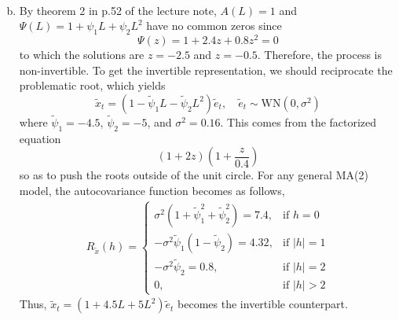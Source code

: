 \documentclass[answers]{exam}
\begin{document}
\begin{questions}
\begin{solution}
\begin{enumerate}[(a)]
\begin{align}
        \end{align}
        \item By theorem 2 in p.52 of the lecture note, $A(L)=1$ and $\Psi(L)=1+\psi_{1}L+\psi_{2}L^{2}$ have no common zeros since
        \begin{equation}
          \Psi(z) = 1+2.4z+0.8z^{2}=0
        \end{equation}
        to which the solutions are $z=-2.5$ and $z=-0.5$. Therefore, the process is non-invertible. To get the invertible representation, we should reciprocate the problematic root, which yields
        \begin{equation}
          \tilde{x}_{t} = \left(1-\tilde{\psi}_{1}L-\tilde{\psi}_{2}L^{2}\right)\tilde{e}_{t}, \quad \tilde{e}_{t}\sim\mathrm{WN}\left(0,\sigma^{2}\right)
        \end{equation}
        where $\tilde{\psi}_{1}=-4.5$, $\tilde{\psi}_{2}=-5$, and $\sigma^{2}=0.16$. This comes from the factorized equation
        \begin{equation}
          \left(1+2z\right)\left(1+\dfrac{z}{0.4}\right)
        \end{equation}
        so as to push the roots outside of the unit circle.
      For any general MA(2) model, the autocovariance function becomes as follows,
      \begin{align}
        R_{\tilde{x}}(h) = \begin{cases}\sigma^{2}\left(1+\tilde{\psi}_{1}^{2}+\tilde{\psi}_{2}^{2}\right)=7.4, & \text{if $h=0$}\\ -\sigma^{2}\tilde{\psi}_{1}\left(1-\tilde{\psi}_{2}\right)=4.32,& \text{if $|h|=1$}\\ -\sigma^{2}\tilde{\psi}_{2}=0.8, & \text{if $|h|=2$}\\ 0, & \text{if $|h|>2$} \end{cases}
      \end{align}
      Thus, $\tilde{x}_{t}=\left(1+4.5L+5L^{2}\right)\tilde{e}_{t}$ becomes the invertible counterpart.
      \end{enumerate}
    \end{solution}
\end{questions}
\end{document}
